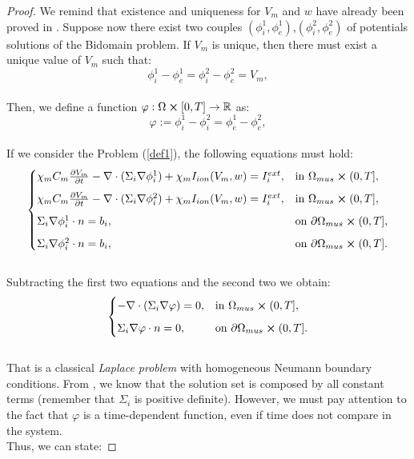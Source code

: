 \documentclass[a4paper,11pt]{article}
\begin{document}
\begin{proof}
	\vspace{2mm} We remind that existence and uniqueness for $V_m$ and $w$ have already been proved in \cite{bourgault}. 
	Suppose now there exist two couples $(\phi_i^1,\phi_e^1)$,$(\phi_i^2,\phi_e^2)$ of potentials solutions of the Bidomain problem. If $V_m$ is unique, then there must exist a unique value of $V_m$ such that:
	\begin{equation*}
	\phi_i^1-\phi_e^1 = \phi_i^2-\phi_e^2 = V_m,
	\end{equation*}\\
	Then, we define a function $\varphi:\Omega \cross [0,T] \rightarrow \mathbb{R}$ as:
	\begin{equation*}
	\varphi := \phi_i^1-\phi_i^2 = \phi_e^1-\phi_e^2,
	\end{equation*}\\
	If we consider the Problem (\ref{def1}), the following equations must hold:
	\begin{equation*}
	\begin{cases}
	\chi_m C_m\pdv{V_m}{t} - \nabla \cdot (\Sigma_i \nabla \phi_i^1) + \chi_m I_{ion}(V_m,w) = I_i^{ext},    & \text{in } \Omega_{mus} \cross (0,T],\vspace{2mm}
	\\
	\chi_m C_m\pdv{V_m}{t} - \nabla \cdot (\Sigma_i \nabla \phi_i^2) + \chi_m I_{ion}(V_m,w) = I_i^{ext},    & \text{in } \Omega_{mus} \cross (0,T],\vspace{2mm}
	\\
	\Sigma_i\nabla \phi_i^1 \cdot n = b_i,   & \text{on } \partial \Omega_{mus} \cross (0,T],\vspace{2mm}
	\\
	\Sigma_i\nabla \phi_i^2 \cdot n = b_i,   & \text{on } \partial \Omega_{mus} \cross (0,T].
	\end{cases}
	\end{equation*}\\
	Subtracting the first two equations and the second two we obtain:
	\begin{equation*}
	\begin{cases}
	- \nabla \cdot (\Sigma_i \nabla \varphi) = 0,    & \text{in } \Omega_{mus} \cross (0,T],\vspace{2mm}
	\\
	\Sigma_i\nabla \varphi \cdot n = 0,   & \text{on } \partial \Omega_{mus} \cross (0,T].
	\end{cases}
	\end{equation*} \\
	That is a classical \emph{Laplace problem} with homogeneous Neumann boundary conditions. From \cite{salsa}, we know that the solution set is composed by all constant terms (remember that $\Sigma_i$ is positive definite). However, we must pay attention to the fact that $\varphi$ is a time-dependent function, even if time does not compare in the system. \\Thus, we can state:
	

\end{proof}
\end{document}
